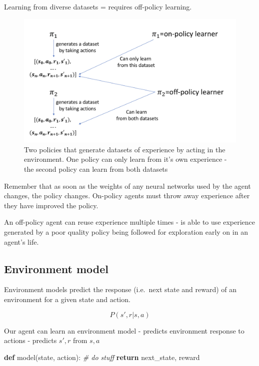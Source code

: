 \documentclass[]{article}
\newenvironment{Shaded}{}{}
\newcommand{\CommentTok}[1]{\textcolor[rgb]{0.38,0.63,0.69}{\textit{#1}}}
\newcommand{\ControlFlowTok}[1]{\textcolor[rgb]{0.00,0.44,0.13}{\textbf{#1}}}
\newcommand{\KeywordTok}[1]{\textcolor[rgb]{0.00,0.44,0.13}{\textbf{#1}}}
\newcommand{\NormalTok}[1]{#1}
\begin{document}
Learning from diverse datasets = requires off-policy learning.

\begin{figure}
\centering
\includegraphics[width=\textwidth,height=0.4\textheight]{./tex2pdf.-4c1708fb449e9e84/bad6552c70d63ef31aafc1f9a8d6f3e06a3157f1.png}
\caption{Two policies that generate datasets of experience by acting in
the environment. One policy can only learn from it's own experience -
the second policy can learn from both datasets}
\end{figure}

Remember that as soon as the weights of any neural networks used by the
agent changes, the policy changes. On-policy agents must throw away
experience after they have improved the policy.

An off-policy agent can reuse experience multiple times - is able to use
experience generated by a poor quality policy being followed for
exploration early on in an agent's life.

\hypertarget{environment-model}{%
\subsection{Environment model}\label{environment-model}}

Environment models predict the response (i.e.~next state and reward) of
an environment for a given state and action.

\[ P(s',r | s, a) \]

Our agent can learn an environment model - predicts environment response
to actions - predicts \(s', r\) from \(s, a\)

\begin{Shaded}
\begin{Highlighting}[]
\KeywordTok{def}\NormalTok{ model(state, action):}
    \CommentTok{# do stuff}
    \ControlFlowTok{return}\NormalTok{ next_state, reward}
\end{Highlighting}
\end{Shaded}
\end{document}
